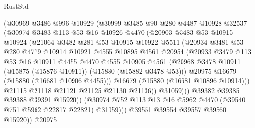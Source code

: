 \begin{lexlean}{RustStd}
\begin{coremodule}
                (@30969
                  @3486
                  @996
                  @10929
                  (@30999
                    @3485
                    @90
                    @280
                    @4487
                    @10928
                    @32537
                    (@30974
                      @3483
                      @113
                      @53
                      @16
                      @10926
                      @4470
                      (@20903
                        @3483
                        @53
                        @10915
                        @10924
                        (@21064
                          @3482
                          @281
                          @53
                          @10915
                          @10922
                          @5511
                          (@20934
                            @3481
                            @53
                            @280
                            @4779
                            @10914
                            @10921
                            @4555
                            @10895
                            @4561
                            @20954
                            (@20933
                              @3479
                              @113
                              @53
                              @16
                              @10911
                              @4455
                              @4470
                              @4555
                              @10905
                              @4561
                              (@20968
                                @3478
                                @10911
                                (@15875 (@15876 @10911))
                                (@15880 (@15882 @3478 @53)))
                              @20975
                              @16679
                              (@15880 (@16681 @10906 @4455)))
                            @16679
                            (@15880 (@16681 @10896 @10914)))
                          @21115
                          @21118
                          @21121
                          @21125
                          @21130
                          @21136))
                      @31059)))
                @39382
                @39385
                @39388
                @39391
                @15920))
            (@30974 @752 @113 @13 @16 @5962 @4470 (@39540 @751 @5962 @22817 @22821) @31059)))
        @39551
        @39554
        @39557
        @39560
        @15920))
    @20975

\end{coremodule}
\end{lexlean}
